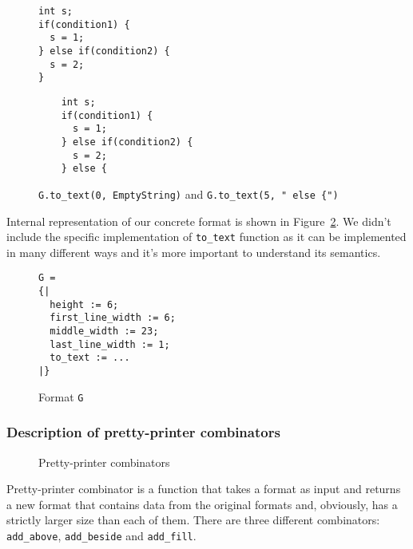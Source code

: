 \documentclass[14pt]{constructor-diploma}
\begin{document}
\begin{enumerate}
\begin{figure}[H]
\begin{minipage}{0.5\textwidth}

\begin{mdframed}[backgroundcolor=bg]
\begin{verbatim}
int s;
if(condition1) { 
  s = 1; 
} else if(condition2) { 
  s = 2; 
}
\end{verbatim}
\end{mdframed}
\end{minipage}
\begin{minipage}{0.5\textwidth}

\begin{mdframed}[backgroundcolor=bg]
\begin{verbatim}
    int s;
    if(condition1) { 
      s = 1; 
    } else if(condition2) { 
      s = 2; 
    } else {
\end{verbatim}
\end{mdframed}
\end{minipage}
\caption{\texttt{G.to\_text(0, EmptyString)} and \texttt{G.to\_text(5, " else \{")}}
\label{fig:to_text_example}
\end{figure}
\end{enumerate}

Internal representation of our concrete format is shown in Figure~\ref{fig:format_example}.
We didn't include the specific implementation of \texttt{to\_text} function as it can be implemented 
in many different ways and it's more important to understand its semantics.
\begin{figure}[H]
\begin{mdframed}[backgroundcolor=bg]
\begin{verbatim}
G = 
{|
  height := 6;
  first_line_width := 6;
  middle_width := 23;
  last_line_width := 1;
  to_text := ...
|}
\end{verbatim}
\end{mdframed}
\caption{Format \texttt{G}}
\label{fig:format_example}
\end{figure}


\label{section_combinators}
\subsubsection{Description of pretty-printer combinators}
\begin{figure}[H]
\begin{center}

\caption{Pretty-printer combinators}
\label{fig:combinators}
\end{center}
\end{figure}
Pretty-printer combinator is a function that takes a format as input and returns a new format that contains data from the original formats and, 
obviously, has a strictly larger size than each of them. 
There are three different combinators: \texttt{add\_above}, \texttt{add\_beside} and 
\texttt{add\_fill}.
\end{document}

